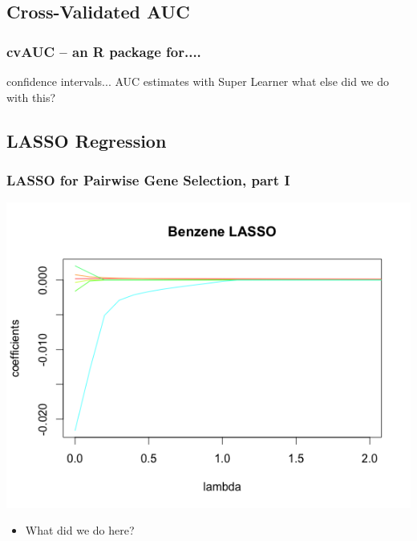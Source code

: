 \documentclass{beamer}
\begin{document}
\subsection{Cross-Validated AUC}

\begin{frame}[fragile]
  	\frametitle{cvAUC -- an R package for....}
 		confidence intervals...
		AUC estimates with Super Learner
		what else did we do with this?
\end{frame}

\subsection{LASSO Regression}

\begin{frame}[fragile]
  	\frametitle{LASSO for Pairwise Gene Selection, part I}
		\centering
 		\includegraphics[scale=0.5]{../paper/figs/lasso_coef.png}
		\begin{itemize}
			\item What did we do here?
		\end{itemize}
\end{frame}
\end{document}
